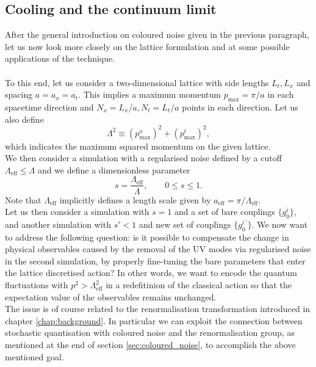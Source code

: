 \subsection*{Cooling and the continuum limit}
After the general introduction on coloured noise given in the previous paragraph, let us now look more closely on the lattice formulation and at some possible applications of the technique. \\~\\
To this end, let us consider a two-dimensional lattice with side lengths $L_t, L_x$ and spacing $a = a_x = a_t$. This implies a maximum momentum $p_\text{max} = \pi / a$ in each spacetime direction and $N_x=L_x/a, N_t=L_t/a$ points in each direction. Let us also define 
\begin{equation}
	\Lambda^2 \equiv (p^x_\text{max})^2 + (p^t_\text{max})^2,
\end{equation}
which indicates the maximum squared momentum on the given lattice. \\
We then consider a simulation with a regularised noise defined by a cutoff $\Lambda_\text{eff} \leq \Lambda$ and we define a dimensionless parameter
\begin{equation}
	s = \frac{\Lambda_\text{eff}}{\Lambda}, \qquad 0 \leq s \leq 1.
\end{equation}
Note that $\Lambda_\text{eff}$ implicitly defines a length scale given by  $a_\text{eff} = \pi/\Lambda_\text{eff}$.\\
Let us then consider a simulation with $s=1$ and a set of bare couplings $\{g^i_0\}$, and another simulation with $s'<1$ and new set of couplings $\{g^{i \, \prime}_0\}$. 
We now want to address the following question: is it possible to compensate the change in physical observables caused by the removal of the UV modes via regularised noise in the second simulation, by properly fine-tuning the bare parameters that enter the lattice discretised action? In other words, we want to encode the quantum fluctuations with $p^2 > \Lambda_\text{eff}^2$ in a redefitinion of the classical action so that the expectation value of the observables remains unchanged.\\
The issue is of course related to the renormalisation transformation introduced in chapter \ref{chap:background}. In particular we can exploit the connection between stochastic quantisation with coloured noise and the renormalisation group, as mentioned at the end of section \ref{sec:coloured_noise}, to accomplish the above mentioned goal. \\
